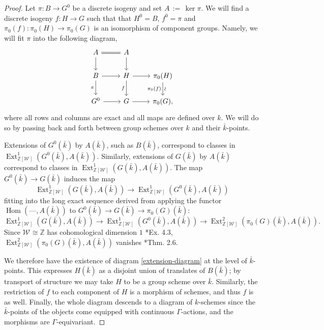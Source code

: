 \documentclass{amsart}
\theoremstyle{plain}
\theoremstyle{definition}
\theoremstyle{remark}
\newcommand{\ZZ}{{\mathbb{Z}}}
\newcommand{\bFq}{\bar{k}}
\newcommand{\Fq}{k}
\newcommand{\Weil}[1]{\mathcal{W}_{#1}}
\DeclareMathOperator{\Hom}{Hom}
\DeclareMathOperator{\Ext}{Ext}
\newcommand{\ceq}{{\, :=\, }}
\begin{document}
\begin{proof}
Let $\pi: B \to G^0$ be a discrete isogeny and set $A \ceq \ker \pi$.
  We will find a discrete isogeny $f: H\to G$
  such that that $H^0 = B$, $f^0 =\pi$ and
  $\pi_0(f) : \pi_0(H)\to \pi_0(G)$ is an isomorphism of component
  groups.  Namely, we will fit $\pi$ into the following diagram,
  \begin{equation}\label{extension-diagram}
  \begin{tikzcd}
  A \arrow[equal]{r} \dar & A \dar \\
  B \rar \dar[swap]{\pi} & H \rar \dar[swap]{f} & \pi_0(H) \arrow{d}[below,rotate=90]{\sim}[swap]{\pi_0(f)} \\
  G^0 \rar & G \rar & \pi_0(G),
  \end{tikzcd}
  \end{equation}
  where all rows and columns are exact and all maps are defined over
  $\Fq$.  We will do so by passing back and forth between group
  schemes over $\Fq$ and their $\bFq$-points.  
  
  Extensions of $G^0(\bFq)$ by $A(\bFq)$, such as $B(\bFq)$,
  correspond to classes in $\Ext^1_{\ZZ[\Weil{}]}(G^0(\bFq), A(\bFq))$.
  Similarly, extensions of $G(\bFq)$ by $A(\bFq)$ correspond to
  classes in $\Ext^1_{\ZZ[\Weil{}]}(G(\bFq), A(\bFq))$.  The map
  $G^0(\bFq) \to G(\bFq)$ induces the map
  \[
  \Ext^1_{\ZZ[\Weil{}]}(G(\bFq), A(\bFq)) \to \Ext^1_{\ZZ[\Weil{}]}(G^0(\bFq), A(\bFq))
  \]
  fitting into the long exact sequence derived from applying
  the functor $\Hom(\mbox{---}, A(\bFq))$ to $G^0(\bFq) \to G(\bFq) \to \pi_0(G)(\bFq)$:
  \[
  \Ext^1_{\ZZ[\Weil{}]}(G(\bFq), A(\bFq)) \to \Ext^1_{\ZZ[\Weil{}]}(G^0(\bFq), A(\bFq)) \to \Ext^2_{\ZZ[\Weil{}]}(\pi_0(G)(\bFq), A(\bFq)).
  \]
  Since $\Weil{} \cong \ZZ$ has cohomological dimension $1$ \cite{brown:CohomologyGrps}*{Ex. 4.3},
  $\Ext^2_{\ZZ[\Weil{}]}(\pi_0(G)(\bFq), A(\bFq))$ vanishes \cite{cartan-eilenberg:HomologicalAlgebra}*{Thm. 2.6}.

  We therefore have the existence of diagram \eqref{extension-diagram}
  at the level of $\bFq$-points.  This expresses $H(\bFq)$ as a
  disjoint union of translates of $B(\bFq)$; by transport of structure
  we may take $H$ to be a group scheme over $\bFq$.  Similarly, the
  restriction of $f$ to each component of $H$ is a morphism of
  schemes, and thus $f$ is as well.  Finally, the whole diagram
  descends to a diagram of $\Fq$-schemes since the $\bFq$-points of
  the objects come equipped with continuous $\Gamma$-actions, and the
  morphisms are $\Gamma$-equivariant.
\end{proof}
\end{document}
